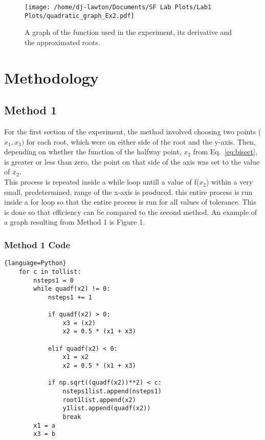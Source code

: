 \documentclass{article}
\begin{document}
\begin{figure}[h]
\begin{flushleft}
	\texttt{[image: /home/dj-lawton/Documents/SF Lab Plots/Lab1 Plots/quadratic\_graph\_Ex2.pdf]}
	\caption{A graph of the function used in the experiment, its derivative and the approximated roots.}
\end{flushleft}
\label{fig:quad1}
\end{figure}

\newpage
\section{Methodology}
\subsection{Method 1}
For the first section of the experiment, the method involved choosing two points ($x_1, x_3)$ for each root, which were on either side of the root and the y-axis. Then, depending on whether the function of the halfway point, $x_2$ from Eq.~\ref{eq:bisect}, is greater or less than zero, the point on that side of the axis was set to the value of $x_2$. \\
\indent This process is repeated inside a while loop untill a value of f($x_2$) within a very small, predetermined, range of the x-axis is produced. this entire process is run inside a for loop so that the entire process is run for all values of tolerance. This is done so that efficiency can be compared to the second method. An example of a graph resulting from Method 1 is Figure 1.
\newpage
\subsubsection{Method 1 Code}
\begin{lstlisting}{language=Python}
    for c in tollist:
        nsteps1 = 0
        while quadf(x2) != 0:
            nsteps1 += 1
           
            if quadf(x2) > 0:
                x3 = (x2)
                x2 = 0.5 * (x1 + x3)
            
            elif quadf(x2) < 0:
                x1 = x2
                x2 = 0.5 * (x1 + x3)
            
            if np.sqrt((quadf(x2))**2) < c:
                nsteps1list.append(nsteps1)
                root1list.append(x2)
                y1list.append(quadf(x2))
                break
        x1 = a
        x3 = b

\end{lstlisting}
\end{document}
